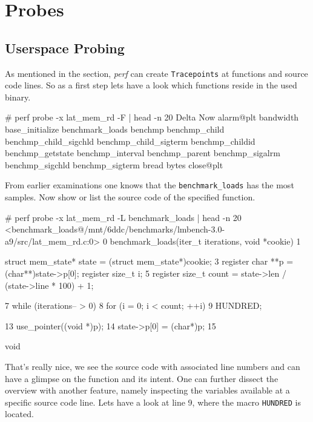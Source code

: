 \chapter{Probes}
\section{Userspace Probing}

As mentioned in the   section, {\em perf} can create
{\tt Tracepoints} at functions and source code lines. So as a first
step lets have a look which functions reside in the used binary.

\starttyping
# perf probe -x lat_mem_rd -F | head -n 20
Delta
Now
alarm@plt
bandwidth
base_initialize
benchmark_loads
benchmp
benchmp_child
benchmp_child_sigchld
benchmp_child_sigterm
benchmp_childid
benchmp_getstate
benchmp_interval
benchmp_parent
benchmp_sigalrm
benchmp_sigchld
benchmp_sigterm
bread
bytes
close@plt
\stoptyping

From earlier examinations one knows that the {\tt benchmark_loads} has the most
samples. Now show or list the source code of the specified function.

\starttyping
# perf probe -x lat_mem_rd -L benchmark_loads | head -n 20
<benchmark_loads@/mnt/6ddc/benchmarks/lmbench-3.0-a9/src/lat_mem_rd.c:0>
      0  benchmark_loads(iter_t iterations, void *cookie)
      1  {
         	struct mem_state* state = (struct mem_state*)cookie;
      3  	register char **p = (char**)state->p[0];
         	register size_t i;
      5  	register size_t count = state->len / (state->line * 100) + 1;

      7  	while (iterations-- > 0) {
      8  		for (i = 0; i < count; ++i) {
      9  			HUNDRED;
         		}
         	}

     13  	use_pointer((void *)p);
     14  	state->p[0] = (char*)p;
     15  }


         void
\stoptyping

That's really nice, we see the source code with associated line
numbers and can have a glimpse on the function and its intent. One can
further dissect the overview with another feature, namely inspecting
the variables available at a specific source code line. Lets have a
look at line 9, where the macro {\tt HUNDRED} is located.


